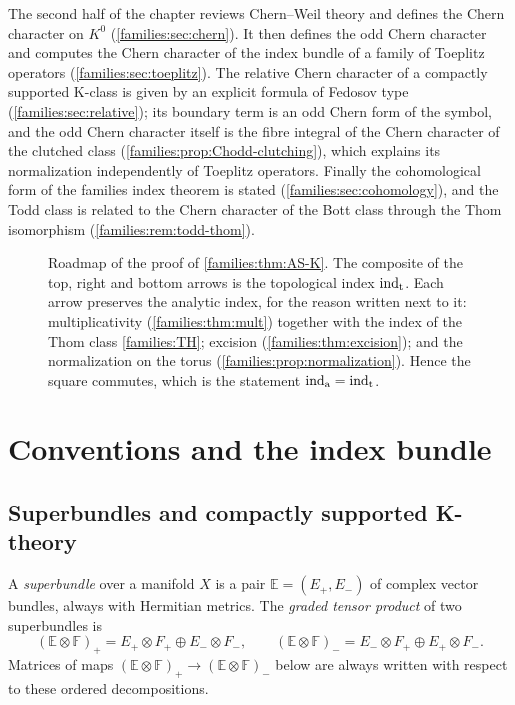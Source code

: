 The second half of the chapter reviews Chern--Weil theory and defines the
Chern character on $K^0$ (\cref{families:sec:chern}). It then defines the odd
Chern character and computes the Chern character of the index bundle of a
family of Toeplitz operators (\cref{families:sec:toeplitz}). The relative Chern
character of a compactly supported K-class is given by an explicit formula of
Fedosov type (\cref{families:sec:relative}); its boundary term is an odd Chern
form of the symbol, and the odd Chern character itself is the fibre integral of the
Chern character of the clutched class (\cref{families:prop:Chodd-clutching}), which
explains its normalization independently of Toeplitz operators. Finally the
cohomological form of the families index theorem is stated
(\cref{families:sec:cohomology}), and the Todd class is related to the Chern
character of the Bott class through the Thom isomorphism
(\cref{families:rem:todd-thom}).

\begin{figure}[ht]
\centering
{}
\caption[Roadmap of the K-theoretic index theorem]{Roadmap of the proof of
\cref{families:thm:AS-K}. The composite of the top, right and bottom arrows is
the topological index $\operatorname{ind}_{\mathrm{t}}$. Each arrow preserves the analytic index, for the
reason written next to it: multiplicativity
(\cref{families:thm:mult}) together with the index of the Thom class
\ref{families:TH}; excision (\cref{families:thm:excision}); and the
normalization on the torus (\cref{families:prop:normalization}). Hence the
square commutes, which is the statement $\operatorname{ind}_{\mathrm{a}}=\operatorname{ind}_{\mathrm{t}}$.}
\label{families:fig:roadmap}
\end{figure}

\section{Conventions and the index bundle}\label{families:sec:prelim}

\subsection{Superbundles and compactly supported K-theory}
A \emph{superbundle} over a manifold $X$ is a pair $\mathbb E=(E_+,E_-)$ of
complex vector bundles, always with Hermitian metrics. The \emph{graded tensor
product} of two superbundles is
\begin{equation}\label{families:eq:graded-tensor}
  (\mathbb E\otimes\mathbb F)_+=E_+\otimes F_+\oplus E_-\otimes F_-,\qquad
  (\mathbb E\otimes\mathbb F)_-=E_-\otimes F_+\oplus E_+\otimes F_-.
\end{equation}
Matrices of maps $(\mathbb E\otimes\mathbb F)_+\to(\mathbb E\otimes\mathbb F)_-$
below are always written with respect to these ordered decompositions.

